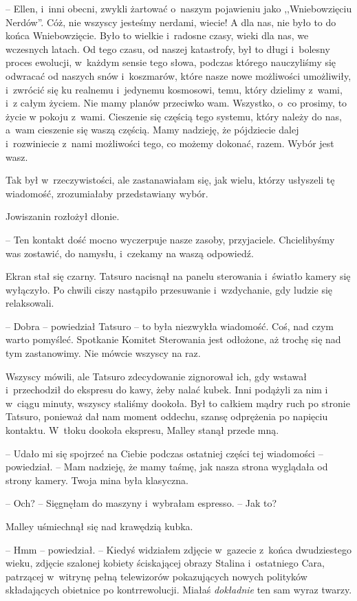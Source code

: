 \documentclass[oneside,polish,11pt,sfheadings]{mwbk}
\begin{document}
-- Ellen, i~inni obecni, zwykli żartować o~naszym pojawieniu jako
,,Wniebowzięciu Nerdów''. Cóż, nie wszyscy jesteśmy nerdami, wiecie! A
dla nas, nie było to do końca Wniebowzięcie. Było to wielkie i~radosne
czasy, wieki dla nas, we wczesnych latach. Od tego czasu, od naszej
katastrofy, był to długi i~bolesny proces ewolucji, w~każdym sensie tego
słowa, podczas którego nauczyliśmy się odwracać od naszych snów i~koszmarów, które nasze nowe możliwości umożliwiły, i~zwrócić się ku
realnemu i~jedynemu kosmosowi, temu, który dzielimy z~wami, i~z całym
życiem. Nie mamy planów przeciwko wam. Wszystko, o~co prosimy, to życie
w pokoju z~wami. Cieszenie się częścią tego systemu, który należy do
nas, a~wam cieszenie się waszą częścią. Mamy nadzieję, że pójdziecie
dalej i~rozwiniecie z~nami możliwości tego, co możemy dokonać, razem.
Wybór jest wasz.

Tak był w~rzeczywistości, ale zastanawiałam się, jak wielu, którzy
usłyszeli tę wiadomość, zrozumiałaby przedstawiany wybór.

Jowiszanin rozłożył dłonie. 

-- Ten kontakt dość mocno wyczerpuje nasze
zasoby, przyjaciele. Chcielibyśmy was zostawić, do namysłu, i~czekamy na
waszą odpowiedź.

Ekran stał się czarny. Tatsuro nacisnął na panelu sterowania i~światło
kamery się wyłączyło. Po chwili ciszy nastąpiło przesuwanie i~wzdychanie, gdy ludzie się relaksowali.

-- Dobra -- powiedział Tatsuro -- to była niezwykła wiadomość. Coś, nad
czym warto pomyśleć. Spotkanie Komitet Sterowania jest odłożone, aż
trochę się nad tym zastanowimy. Nie mówcie wszyscy na raz.

Wszyscy mówili, ale Tatsuro zdecydowanie zignorował ich, gdy wstawał i~przechodził do ekspresu do kawy, żeby nalać kubek. Inni podążyli za nim
i w~ciągu minuty, wszyscy staliśmy dookoła. Był to całkiem mądry ruch po
stronie Tatsuro, ponieważ dał nam moment oddechu, szansę odprężenia po
napięciu kontaktu. W~tłoku dookoła ekspresu, Malley stanął przede mną.

-- Udało mi się spojrzeć na Ciebie podczas ostatniej części tej
wiadomości -- powiedział. -- Mam nadzieję, że mamy taśmę, jak nasza strona
wyglądała od strony kamery. Twoja mina była klasyczna.

-- Och? -- Sięgnęłam do maszyny i~wybrałam espresso. -- Jak to?

Malley uśmiechnął się nad krawędzią kubka. 

-- Hmm -- powiedział. -- Kiedyś
widziałem zdjęcie w~gazecie z~końca dwudziestego wieku, zdjęcie szalonej
kobiety ściskającej obrazy Stalina i~ostatniego Cara, patrzącej w~witrynę pełną telewizorów pokazujących nowych polityków składających
obietnice po kontrrewolucji. Miałaś \textit{dokładnie} ten sam wyraz
twarzy.
\end{document}

